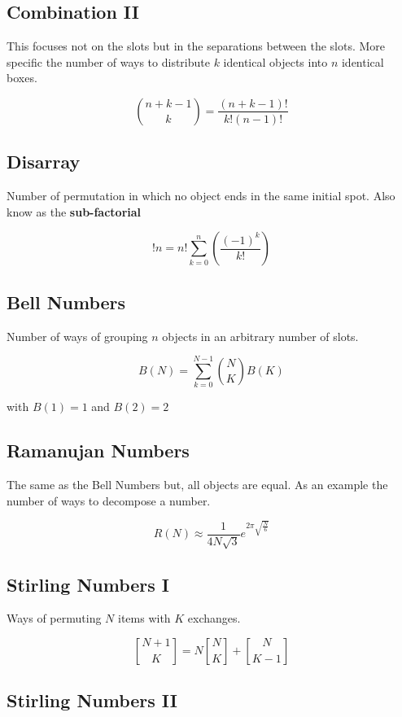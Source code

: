 \subsection{Combination II}

This focuses not on the slots but in the separations between the slots.
More specific the number of ways to distribute \(k\) identical objects into \(n\) identical boxes. 

\[\binom{n + k - 1}{k} = \frac{(n + k - 1)!}{k!(n - 1)!}\]

\subsection{Disarray}

Number of permutation in which no object ends in the same initial spot. Also know as the \textbf{sub-factorial}

\[!n = n! \sum_{k = 0}^{n} \left(\frac{{(-1)}^k}{k!}\right)\]

\subsection{Bell Numbers}

Number of ways of grouping \(n\) objects in an arbitrary number of slots.

\[B(N) = \sum_{k = 0}^{N-1}\binom{N}{K}B(K)\]

with \(B(1) = 1\) and \(B(2) = 2\)

\subsection{Ramanujan Numbers}

The same as the Bell Numbers but, all objects are equal. As an example the number of ways
to decompose a number.

\[R(N) \approx \frac{1}{4N\sqrt{3}} e^{2\pi \sqrt{\frac{N}{6}}}\]

\subsection{Stirling Numbers I}

Ways of permuting \(N\) items with \(K\) exchanges.

\[
\genfrac{[}{]}{0pt}{}{N + 1}{K} = N \genfrac{[}{]}{0pt}{}{N}{K} + \genfrac{[}{]}{0pt}{}{N}{K - 1}
\]


\subsection{Stirling Numbers II}

